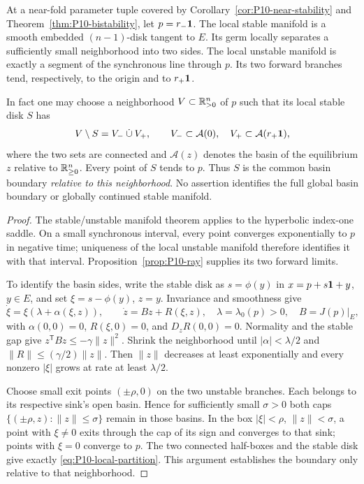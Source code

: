 \begin{proposition}
\label{prop:P10-local-basins}
At a near-fold parameter tuple covered by
Corollary~\ref{cor:P10-near-stability} and
Theorem~\ref{thm:P10-bistability}, let $p=r_-\mathbf{1}$.
The local stable manifold is a smooth embedded $(n-1)$-disk tangent
to $E$. Its germ locally separates a sufficiently small neighborhood
into two sides. The local unstable manifold is exactly a segment of
the synchronous line through $p$. Its two forward branches tend,
respectively, to the origin and to $r_+\mathbf{1}$.

In fact one may choose a neighborhood $V\subset\mathbb{R}_{>0}^{n}$ of $p$
such that its local stable disk $S$ has
\begin{equation}
 V\setminus S=V_-\mathbin{\dot\cup}V_+,\qquad
 V_-\subset\mathcal A(0),\quad V_+\subset\mathcal A(r_+\mathbf{1}),
 \label{eq:P10-local-partition}
\end{equation}
where the two sets are connected and $\mathcal A(z)$ denotes the
basin of the equilibrium $z$ relative to $\mathbb{R}_{\geq 0}^{n}$. Every point of
$S$ tends to $p$. Thus $S$ is the common basin boundary \emph{relative
to this neighborhood}. No assertion identifies the full global basin
boundary or globally continued stable manifold.
\end{proposition}
\begin{proof}
The stable/unstable manifold theorem \cite[Ch.~1]{GuckenheimerHolmes1983}
applies to the hyperbolic index-one saddle. On a small synchronous
interval, every point converges exponentially to $p$ in negative time;
uniqueness of the local unstable manifold therefore identifies it with
that interval. Proposition~\ref{prop:P10-ray} supplies its two forward limits.

To identify the basin sides, write the stable disk as $s=\phi(y)$ in
$x=p+s\mathbf{1}+y$, $y\in E$, and set $\xi=s-\phi(y)$, $z=y$.
Invariance and smoothness give
\begin{equation}
 \dot\xi=\xi(\lambda+\alpha(\xi,z)),\qquad
 \dot z=Bz+R(\xi,z),\quad \lambda=\lambda_0(p)>0,\quad B=J(p)|_E,
 \label{eq:P10-saddle-chart}
\end{equation}
with $\alpha(0,0)=0$, $R(\xi,0)=0$, and $D_zR(0,0)=0$.
Normality and the stable gap give $z^{\mathsf T}Bz\le-\gamma\|z\|^2$.
Shrink the neighborhood until $|\alpha|<\lambda/2$ and
$\|R\|\le(\gamma/2)\|z\|$. Then $\|z\|$ decreases at least
exponentially and every nonzero $|\xi|$ grows at rate at least $\lambda/2$.

Choose small exit points $(\pm\rho,0)$ on the two unstable branches.
Each belongs to its respective sink's open basin. Hence for sufficiently
small $\sigma>0$ both caps $\{(\pm\rho,z):\|z\|\le\sigma\}$
remain in those basins. In the box $|\xi|<\rho$, $\|z\|<\sigma$,
a point with $\xi\ne0$ exits through the cap of its sign and converges
to that sink; points with $\xi=0$ converge to $p$. The two connected
half-boxes and the stable disk give exactly \eqref{eq:P10-local-partition}.
This argument establishes the boundary only relative to that neighborhood.
\end{proof}


